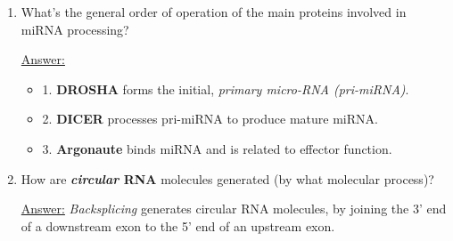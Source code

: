 \documentclass{article}
\newenvironment{QandA}{\begin{enumerate}[label=\bfseries Q\arabic*.]}
                       {\end{enumerate}}
\newenvironment{answered}{\par\normalfont\underline{Answer:}}{}
\begin{document}
\begin{QandA}
    \begin{answered}
    As with host cells, \textit{splicing generates \textbf{transcriptome diversity}}. The \textbf{genome economy} this facilitates, allowing the virus a compact but information-rich genome, is valuable.
    \end{answered}
  \item{What's the general order of operation of the main proteins involved in miRNA processing?}
    \begin{answered}
    \begin{itemize}
      \item{1. \textbf{DROSHA} forms the initial, \textit{primary micro-RNA (pri-miRNA)}.}
      \item{2. \textbf{DICER} processes pri-miRNA to produce mature miRNA.}
      \item{3. \textbf{Argonaute} binds miRNA and is related to effector function.}
    \end{itemize}
    \end{answered}
  \item{How are \textbf{\textit{circular} RNA} molecules generated (by what molecular process)?}
    \begin{answered}
    \textit{Backsplicing} generates circular RNA molecules, by joining the 3' end of a downstream exon to the 5' end of an upstream exon.
    \end{answered}
\end{QandA}
\end{document}
